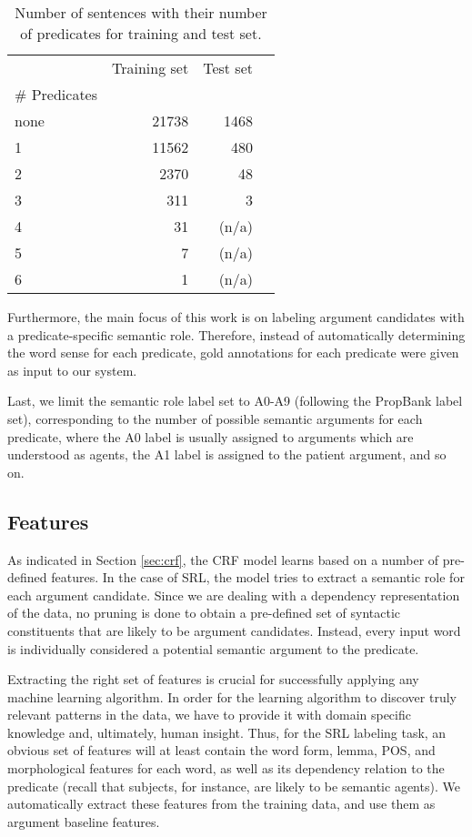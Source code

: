 \documentclass[a4paper,twoside,12pt]{article}
\begin{document}
\begin{table}[!h]
\centering
\captionsetup{justification=centering}
	\begin{tabulary}{\textwidth}{LRRC}\toprule
        & Training set & Test set\\\cmidrule(lr){2-2}\cmidrule(lr){3-3}
	    \# Predicates &  & \\\cmidrule(lr){1-3}\morecmidrules\cmidrule(lr){1-3}
	    none & 21738 & 1468 \\
		1 & 11562 & 480 \\
		2 & 2370 & 48 \\
		3 & 311 & 3 \\
		4 & 31 & (n/a) \\
		5 & 7 & (n/a) \\
		6 & 1 & (n/a) \\
		\bottomrule
	\end{tabulary}
\caption{Number of sentences with their number of predicates for training and test set. \label{tab:data}}
\end{table}

Furthermore, the main focus of this work is on labeling argument candidates with a predicate-specific semantic role. Therefore, instead of automatically determining the word sense for each predicate, gold annotations for each predicate were given as input to our system.

Last, we limit the semantic role label set to A0-A9 (following the PropBank label set), corresponding to the number of possible semantic arguments for each predicate, where the A0 label is usually assigned to arguments which are understood as agents, the A1 label is assigned to the patient argument, and so on.

\pagebreak
\subsection{Features}
\label{sub:feat}

As indicated in Section \ref{sec:crf}, the CRF model learns based on a number of pre-defined features. In the case of SRL, the model tries to extract a semantic role for each argument candidate. Since we are dealing with a dependency representation of the data, no pruning is done to obtain a pre-defined set of syntactic constituents that are likely to be argument candidates. Instead, every input word is individually considered a potential semantic argument to the predicate.

Extracting the right set of features is crucial for successfully applying any machine learning algorithm. In order for the learning algorithm to discover truly relevant patterns in the data, we have to provide it with domain specific knowledge and, ultimately, human insight. Thus, for the SRL labeling task, an obvious set of features will at least contain the word form, lemma, POS, and morphological features for each word, as well as its dependency relation to the predicate (recall that subjects, for instance, are likely to be semantic agents). We automatically extract these features from the training data, and use them as argument baseline features.
\end{document}
